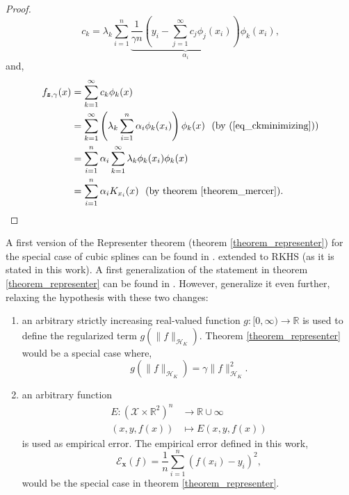 \begin{theorem}
\begin{proof}
\begin{equation}
      c_k = \lambda_k 
         \sum_{i=1}^n \underbrace{\frac{1}{\gamma n} \left( y_i - \sum_{j=1}^{\infty} c_j \phi_j(x_i) \right)}_{\alpha_i} \phi_k(x_i),
    \end{equation}
    and,
    \begin{equation*}
      \begin{aligned}
        f_{\pmb{z},\gamma}(x) &= \sum_{k=1}^{\infty} c_k \phi_k(x) \\
          &= \sum_{k=1}^{\infty} 
           \left( \lambda_k \sum_{i=1}^n \alpha_i \phi_k(x_i) \right) \phi_k(x) 
             \ \ \text{(by (\ref{eq_ckminimizing}))} \\
          &= \sum_{i=1}^n \alpha_i \sum_{k=1}^{\infty} \lambda_k \phi_k(x_i) \phi_k(x) \\
          &= \sum_{i=1}^n \alpha_i K_{x_i}(x) \ \ \text{(by theorem \ref{theorem_mercer})}.
      \end{aligned}
    \end{equation*}    
  \end{proof}
\end{theorem}

A first version of the Representer theorem (theorem \ref{theorem_representer}) for the special case of cubic splines can be found in \textcite{schoenberg1964}. \textcite{kimeldorf1971} extended to RKHS (as it is stated in this work). A first generalization of the statement in theorem \ref{theorem_representer} can be found in \textcite{osullivan1986}. However, \textcite{scholkopf2001} generalize it even further, relaxing the hypothesis with these two changes:
\begin{enumerate}
  \item an arbitrary strictly increasing real-valued function $g: [0,\infty) \to \mathbb{R}$ is used to define the regularized term $g(\|f\|_{\mathcal{H}_K})$. Theorem \ref{theorem_representer} would be a special case where,
  \begin{equation*}
    g(\|f\|_{\mathcal{H}_K}) = \gamma \|f\|^2_{\mathcal{H}_K}.
  \end{equation*}
  \item an arbitrary function 
    \begin{equation*}
      \begin{aligned}
        E : (\mathcal{X} \times \mathbb{R}^2)^n &\to \mathbb{R} \cup {\infty} \\
            (x,y,f(x))                &\mapsto E(x,y,f(x))
      \end{aligned}
    \end{equation*}
   is used as empirical error. The empirical error defined in this work,
   \begin{equation*}
     \mathcal{E}_{\pmb{x}}(f) = \frac{1}{n} \sum_{i=1}^{n} (f(x_i)-y_i)^2, 
   \end{equation*}
   would be the special case in theorem \ref{theorem_representer}.
\end{enumerate}

